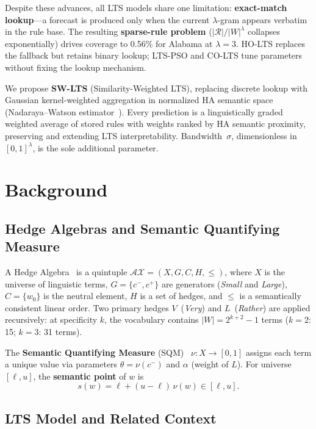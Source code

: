 \documentclass{llncs}
\begin{document}
Despite these advances, all LTS models share one limitation:
\textbf{exact-match lookup}---a forecast is produced only when the
current $\lambda$-gram appears verbatim in the rule base. The resulting
\textbf{sparse-rule problem} ($|\mathcal{R}|/|W|^\lambda$ collapses
exponentially) drives coverage to 0.56\% for Alabama at $\lambda=3$.
HO-LTS replaces the fallback but retains binary lookup; LTS-PSO and
CO-LTS tune parameters without fixing the lookup mechanism.

We propose \textbf{SW-LTS} (Similarity-Weighted LTS), replacing
discrete lookup with Gaussian kernel-weighted aggregation in normalized
HA semantic space (Nadaraya--Watson estimator~\cite{nadaraya1964}).
Every prediction is a linguistically graded weighted average of stored
rules with weights ranked by HA semantic proximity, preserving and
extending LTS interpretability. Bandwidth~$\sigma$, dimensionless in
$[0,1]^\lambda$, is the sole additional parameter.

\section{Background}
\label{sec:background}

\subsection{Hedge Algebras and Semantic Quantifying Measure}

A Hedge Algebra~\cite{catho2002ha} is a quintuple
$\mathcal{AX}=(X, G, C, H, \leq)$, where $X$ is the universe of
linguistic terms, $G=\{c^-,c^+\}$ are generators (\emph{Small} and
\emph{Large}), $C=\{w_0\}$ is the neutral element, $H$ is a set of
hedges, and $\leq$ is a semantically consistent linear order. Two
primary hedges $V$~(\emph{Very}) and $L$~(\emph{Rather}) are applied
recursively: at specificity $k$, the vocabulary contains
$|W|=2^{k+2}-1$ terms ($k=2$: 15; $k=3$: 31 terms).

The \textbf{Semantic Quantifying Measure}
(SQM)~\cite{catho2002sqm} $\nu:X\to[0,1]$ assigns each term a unique
value via parameters $\theta=\nu(c^-)$ and $\alpha$ (weight of $L$).
For universe $[\ell,u]$, the \textbf{semantic point} of $w$ is
\begin{equation}
  s(w) = \ell + (u-\ell)\,\nu(w) \in [\ell,u].
\label{eq:sp}
\end{equation}

\subsection{LTS Model and Related Context}
\label{sec:lts}
\end{document}
